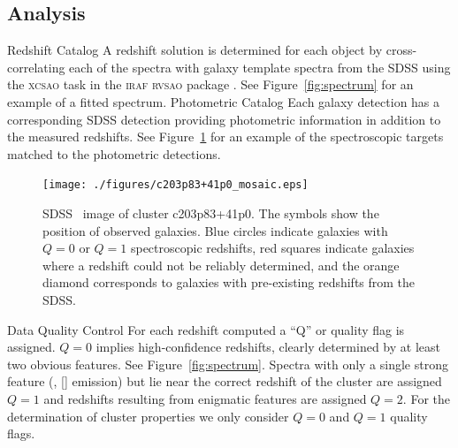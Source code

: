 \documentclass[12pt]{article}
\begin{document}
\subsection{Analysis}
\begin{outline}[enumerate]
	\1 Redshift Catalog
		\2 A redshift solution is determined for each object by cross-correlating \citep{Tonry1979} each of the spectra with galaxy template spectra from the SDSS using the \textsc{xcsao} task in the \textsc{iraf} \textsc{rvsao} package \citep{Kurtz1992}. See Figure~\ref{fig:spectrum} for an example of a fitted spectrum.
	\1 Photometric Catalog
		\2 Each galaxy detection has a corresponding SDSS detection providing photometric information in addition to the measured redshifts. See Figure~\ref{fig:mosaic} for an example of the spectroscopic targets matched to the photometric detections.
		\begin{figure} 
			\texttt{[image: ./figures/c203p83+41p0\_mosaic.eps]} 
			\caption{SDSS \sdssr\ image of cluster c203p83+41p0. The symbols show the position of observed galaxies. Blue circles indicate galaxies with $Q=0$ or $Q=1$ spectroscopic redshifts, red squares indicate galaxies where a redshift could not be reliably determined, and the orange diamond corresponds to galaxies with pre-existing redshifts from the SDSS.}
			\label{fig:mosaic} 
		\end{figure}
	\1 Data Quality Control
		\2 For each redshift computed a ``Q'' or quality flag is assigned. $Q=0$ implies high-confidence redshifts, clearly determined by at least two obvious features. See Figure~\ref{fig:spectrum}. Spectra with only a single strong feature (\eg, [] emission) but lie near the correct redshift of the cluster are assigned $Q=1$ and redshifts resulting from enigmatic features are assigned $Q=2$. For the determination of cluster properties we only consider $Q=0$ and $Q=1$ quality flags.
\end{outline}
\end{document}
